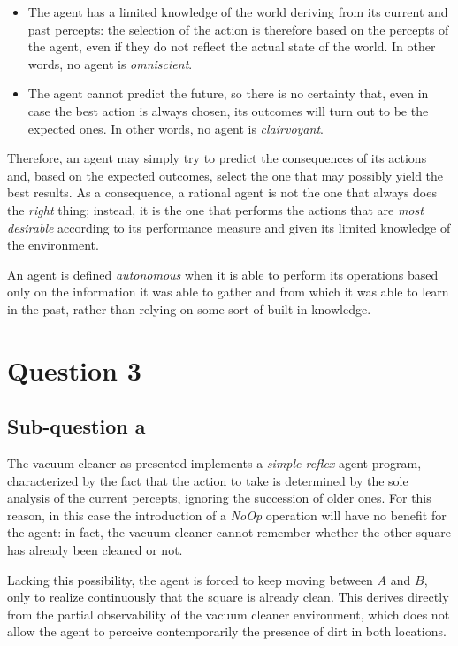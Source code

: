 \documentclass[letterpaper,headings=standardclasses]{scrartcl}
\begin{document}
\begin{itemize}

\item The agent has a limited knowledge of the world deriving from its current and past percepts: the selection of the action is therefore based on the percepts of the agent, even if they do not reflect the actual state of the world. In other words, no agent is \emph{omniscient}.
\item The agent cannot predict the future, so there is no certainty that, even in case the best action is always chosen, its outcomes will turn out to be the expected ones. In other words, no agent is \emph{clairvoyant}. 
 
\end{itemize}

Therefore, an agent may simply try to predict the consequences of its actions and, based on the expected outcomes, select the one that may possibly yield the best results. As a consequence, a rational agent is not the one that always does the \emph{right} thing; instead, it is the one that performs the actions that are \emph{most desirable} according to its performance measure and given its limited knowledge of the environment.

An agent is defined \emph{autonomous} when it is able to perform its operations based only on the information it was able to gather and from which it was able to learn in the past, rather than relying on some sort of built-in knowledge.

\section{Question 3}

\subsection{Sub-question a}

The vacuum cleaner as presented implements a \emph{simple reflex} agent program, characterized by the fact that the action to take is determined by the sole analysis of the current percepts, ignoring the succession of older ones. For this reason, in this case the introduction of a \emph{NoOp} operation will have no benefit for the agent: in fact, the vacuum cleaner cannot remember whether the other square has already been cleaned or not.

Lacking this possibility, the agent is forced to keep moving between $A$ and $B$, only to realize continuously that the square is already clean. This derives directly from the partial observability of the vacuum cleaner environment, which does not allow the agent to perceive contemporarily the presence of dirt in both locations.
\end{document}
